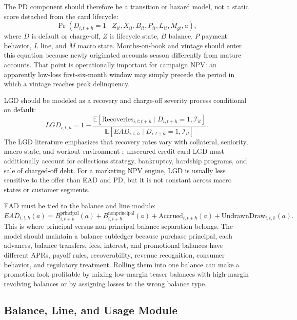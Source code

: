 \documentclass[11pt]{article}
\newcommand{\E}{\mathbb{E}}
\newcommand{\1}{\mathbf{1}}
\begin{document}
The PD component should therefore be a transition or hazard model, not a static
score detached from the card lifecycle:
\begin{equation}
  \Pr(D_{i,t+h}=1\mid Z_{it},X_{it},B_{it},P_{it},L_{it},M_{gt},a),
  \label{eq:pd-transition}
\end{equation}
where $D$ is default or charge-off, $Z$ is lifecycle state, $B$ balance, $P$
payment behavior, $L$ line, and $M$ macro state. Months-on-book and vintage
should enter this equation because newly originated accounts season differently
from mature accounts. That point is operationally important for campaign NPV:
an apparently low-loss first-six-month window may simply precede the period in
which a vintage reaches peak delinquency.

LGD should be modeled as a recovery and charge-off severity process conditional
on default:
\begin{equation}
  LGD_{i,t,h}
  =
  1-
  \frac{\E[\mathrm{Recoveries}_{i,t:t+h}\mid D_{i,t+h}=1,\mathcal{I}_{it}]}
       {\E[EAD_{i,t,h}\mid D_{i,t+h}=1,\mathcal{I}_{it}]}.
  \label{eq:lgd-recovery}
\end{equation}
The LGD literature emphasizes that recovery rates vary with collateral,
seniority, macro state, and workout environment \citep{schuermann2004lgd};
unsecured credit-card LGD must additionally account for collections strategy,
bankruptcy, hardship programs, and sale of charged-off debt. For a marketing
NPV engine, LGD is usually less sensitive to the offer than EAD and PD, but it
is not constant across macro states or customer segments.

EAD must be tied to the balance and line module:
\begin{equation}
  EAD_{i,t,h}(a)
  =
  B_{i,t+h}^{\mathrm{principal}}(a)
  + B_{i,t+h}^{\mathrm{nonprincipal}}(a)
  + \mathrm{Accrued}_{i,t+h}(a)
  + \mathrm{UndrawnDraw}_{i,t,h}(a).
  \label{eq:ead-balance-link}
\end{equation}
This is where principal versus non-principal balance separation belongs. The
model should maintain a balance subledger because
purchase principal, cash advances, balance transfers, fees, interest, and
promotional balances have different APRs, payoff rules, recoverability, revenue
recognition, consumer behavior, and regulatory treatment. Rolling them into one
balance can make a promotion look profitable by mixing low-margin teaser
balances with high-margin revolving balances or by assigning losses to the
wrong balance type.

\subsection{Balance, Line, and Usage Module}
\label{subsec:balance-module}
\end{document}
